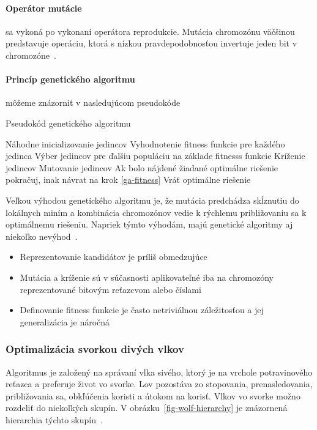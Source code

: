 \documentclass[a4paper,slovak,12pt,appendix]{article}
\begin{document}
\paragraph{Operátor mutácie} sa vykoná po vykonaní operátora reprodukcie.
Mutácia chromozónu väčšinou predstavuje operáciu, ktorá s nízkou
pravdepodobnosťou invertuje jeden bit v chromozóne~\cite{Chavan2015}.

\paragraph{Princíp genetického algoritmu} môžeme znázorniť v nasledujúcom
pseudokóde~\cite{Chavan2015}
\begin{algorithm}
  \caption{Pseudokód genetického algoritmu}
  \begin{algorithmic}[1]
    \State Náhodne inicializovanie jedincov
    \State Vyhodnotenie fitness funkcie pre každého jedinca \label{ga-fitness}
    \State Výber jedincov pre ďalšiu populáciu na základe fitnesss funkcie
    \State Kríženie jedincov
    \State Mutovanie jedincov
    \State Ak bolo nájdené žiadané optimálne riešenie pokračuj, inak návrat na krok \ref{ga-fitness}
    \State Vráť optimálne riešenie
  \end{algorithmic}
\end{algorithm}

Veľkou výhodou genetického algoritmu je, že mutácia predchádza skĺznutiu do
lokálnych miním a kombinácia chromozónov vedie k rýchlemu približovaniu
sa k optimálnemu riešeniu. Napriek týmto výhodám, majú genetické algoritmy aj
niekoľko nevýhod~\cite{Deolekar2016}.
\begin{itemize}
  \item Reprezentovanie kandidátov je príliš obmedzujúce
  \item Mutácia a kríženie sú v súčasnosti aplikovateľné iba na chromozóny
        reprezentované bitovým reťazcvom alebo číslami
  \item Definovanie fitness funkcie je často netriviálnou záležitosťou
        a jej generalizácia je náročná
\end{itemize}


\subsubsection{Optimalizácia svorkou divých vlkov}
Algoritmus je založený na správaní vlka sivého, ktorý je na vrchole
potravinového reťazca a preferuje život vo svorke. Lov pozostáva zo stopovania,
prenasledovania, približovania sa, obkľúčenia koristi a útokom na korisť. Vlkov
vo svorke možno rozdeliť do niekoľkých skupín.
V obrázku~\ref{fig-wolf-hierarchy} je znázornená hierarchia týchto
skupín~\cite{Seeley1991}.
\end{document}
